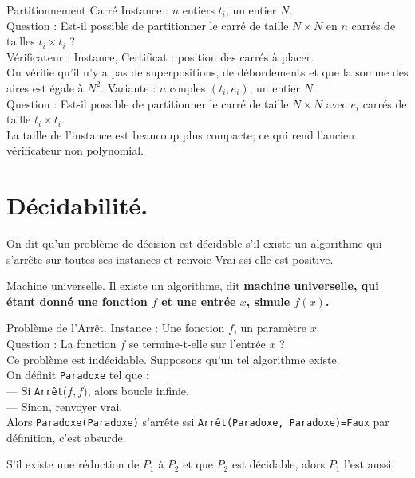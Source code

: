 \documentclass[french, 11pt]{article}
\begin{document}
\begin{ex}{Partitionnement Carré}{}
    Instance : $n$ entiers $t_i$, un entier $N$.\\
    Question : Est-il possible de partitionner le carré de taille $N\times N$ en $n$ carrés de tailles $t_i\times t_i$ ?\\
    Vérificateur : Instance, Certificat : position des carrés à placer.\\
    On vérifie qu'il n'y a pas de superpositions, de débordements et que la somme des aires est égale à $N^2$.\n
    Variante : $n$ couples $(t_i, e_i)$, un entier $N$.\\
    Question : Est-il possible de partitionner le carré de taille $N\times N$ avec $e_i$ carrés de taille $t_i\times t_i$.\\
    La taille de l'instance est beaucoup plus compacte; ce qui rend l'ancien vérificateur non polynomial.
\end{ex}

\section{Décidabilité.}

\begin{defi}{}{}
    On dit qu'un problème de décision est décidable s'il existe un algorithme qui s'arrête sur toutes ses instances et renvoie Vrai ssi elle est positive.
\end{defi}

\begin{thm}{Machine universelle.}{}
    Il existe un algorithme, dit \bf{machine universelle}, qui étant donné une fonction $f$ et une entrée $x$, simule $f(x)$.
\end{thm}

\begin{ex}{Problème de l'Arrêt.}{}
    Instance : Une fonction $f$, un paramètre $x$.\\
    Question : La fonction $f$ se termine-t-elle sur l'entrée $x$ ?\\
    Ce problème est indécidable.
    \tcblower
    Supposons qu'un tel algorithme existe.\\
    On définit \texttt{Paradoxe} tel que :\\
    --- Si \texttt{Arrêt}($f, f$), alors boucle infinie.\\
    --- Sinon, renvoyer vrai.\\
    Alors \texttt{Paradoxe(Paradoxe)} s'arrête ssi \texttt{Arrêt(Paradoxe, Paradoxe)=Faux} par définition, c'est absurde.
\end{ex}

\begin{prop}{}{}
    S'il existe une réduction de $P_1$ à $P_2$ et que $P_2$ est décidable, alors $P_1$ l'est aussi.
\end{prop}
\end{document}
